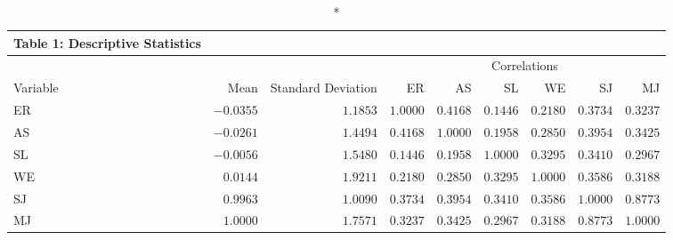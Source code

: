 \begin{longtable}{lrrrrrrrr}
\caption*{
{\large Table 1: Descriptive Statistics}
} \\ 
\toprule
 &  &  & \multicolumn{6}{c}{Correlations} \\ 
\cmidrule(lr){4-9}
Variable & Mean & Standard Deviation & ER & AS & SL & WE & SJ & MJ \\ 
\midrule
ER & $-0.0355$ & $1.1853$ & $1.0000$ & $0.4168$ & $0.1446$ & $0.2180$ & $0.3734$ & $0.3237$ \\ 
AS & $-0.0261$ & $1.4494$ & $0.4168$ & $1.0000$ & $0.1958$ & $0.2850$ & $0.3954$ & $0.3425$ \\ 
SL & $-0.0056$ & $1.5480$ & $0.1446$ & $0.1958$ & $1.0000$ & $0.3295$ & $0.3410$ & $0.2967$ \\ 
WE & $0.0144$ & $1.9211$ & $0.2180$ & $0.2850$ & $0.3295$ & $1.0000$ & $0.3586$ & $0.3188$ \\ 
SJ & $0.9963$ & $1.0090$ & $0.3734$ & $0.3954$ & $0.3410$ & $0.3586$ & $1.0000$ & $0.8773$ \\ 
MJ & $1.0000$ & $1.7571$ & $0.3237$ & $0.3425$ & $0.2967$ & $0.3188$ & $0.8773$ & $1.0000$ \\ 
\bottomrule
\end{longtable}

